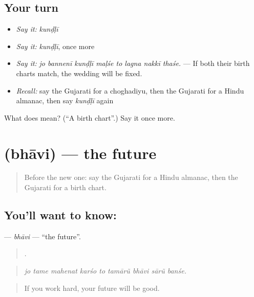 \subsection*{Your turn}
\begin{itemize}
\raggedright
  \item \emph{Say it:} \emph{kunḍḷī}
  \item \emph{Say it:} \emph{kunḍḷī}, once more
  \item \emph{Say it:} \emph{jo bannenī kunḍḷī maḷśe to lagna nakkī thaśe.} — If both their birth charts match, the wedding will be fixed.
  \item \emph{Recall:} say the Gujarati for a choghadiyu, then the Gujarati for a Hindu almanac, then say \emph{kunḍḷī} again
\end{itemize}

\begin{tcolorbox}[breakable,colback=teal!4,colframe=teal!35!black,title={Before you move on}]
What does  mean? (\textquotedblleft{}A birth chart\textquotedblright{}.) Say it once more.
\end{tcolorbox}
\section[\texorpdfstring{\gu{ભાવિ} (bhāvi)}{ભાવિ (bhāvi)}]{ (bhāvi) — the future}

\label{lesson:GU-C536-bhavi}



\begin{quote}
Before the new one: say the Gujarati for a Hindu almanac, then the Gujarati for a birth chart.
\end{quote}

\subsection*{You'll want to know: }
\textbf{} — \emph{bhāvi} — \textquotedblleft{}the future\textquotedblright{}.

\begin{quote}
        .
\end{quote}

\begin{quote}
\emph{jo tame mahenat karśo to tamārũ bhāvi sārũ banśe.}
\end{quote}

\begin{quote}
If you work hard, your future will be good.
\end{quote}

